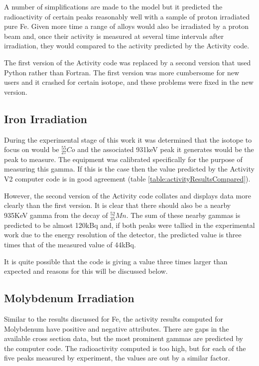 A number of simplifications are made to the model but it predicted the radioactivity of certain peaks reasonably well with a sample of proton irradiated pure Fe.  Given more time a range of alloys would also be irradiated by a proton beam and, once their activity is measured at several time intervals after irradiation, they would compared to the activity predicted by the Activity code.

The first version of the Activity code was replaced by a second version that used Python rather than Fortran.  The first version was more cumbersome for new users and it crashed for certain isotope, and these problems were fixed in the new version.



\subsection{Iron Irradiation}

During the experimental stage of this work it was determined that the isotope to focus on would be ${}^{55}_{27} Co$ and the associated 931keV peak it generates would be the peak to measure.  The equipment was calibrated specifically for the purpose of measuring this gamma.  If this is the case then the value predicted by the Activity V2 computer code is in good agreement (table \ref{table:activityResultsCompared}). 

However, the second version of the Activity code collates and displays data more clearly than the first version.  It is clear that there should also be a nearby 935KeV gamma from the decay of ${}^{52}_{25}Mn$.  The sum of these nearby gammas is predicted to be almost 120kBq and, if both peaks were tallied in the experimental work due to the energy resolution of the detector, the predicted value is three times that of the measured value of 44kBq.

It is quite possible that the code is giving a value three times larger than expected and reasons for this will be discussed below.


\subsection{Molybdenum Irradiation}

Similar to the results discussed for Fe, the activity results computed for Molybdenum have positive and negative attributes.  There are gaps in the available cross section data, but the most prominent gammas are predicted by the computer code.  The radioactivity computed is too high, but for each of the five peaks measured by experiment, the values are out by a similar factor.


